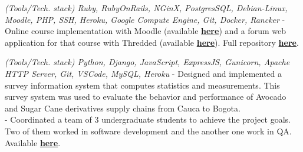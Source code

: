\documentclass[]{CV-JuanCamiloFlorez}
\begin{document}
\begin{minipage}[t]{0.66\textwidth}
    \focusareas{}
    \textit{(Tools/Tech. stack) Ruby, RubyOnRails, NGinX, PostgresSQL, Debian-Linux, Moodle, PHP, SSH, Heroku, Google Compute Engine, Git, Docker, Rancker}
        - Online course implementation with Moodle (available \textbf{\href{https://gitlab.com/VanJFlorez/animal_modeling_ethics/tree/master/docs/4 LMS build}{here}}) and a forum web application for that course with Thredded (available \textbf{\href{https://gitlab.com/VanJFlorez/animal_modeling_ethics/blob/master/docs/3\%20Social\%20WebApp/CP\%20etica\%20animal\%20webApp.pdf}{here}}). Full repository \textbf{\href{https://gitlab.com/VanJFlorez/animal_modeling_ethics/}{here}}. \\
        \sectionsep

    \focusareas{}
    \textit{(Tools/Tech. stack) Python, Django, JavaScript, ExpressJS, Gunicorn, Apache HTTP Server, Git, VSCode, MySQL, Heroku}
        - Designed and implemented a survey information system that computes statistics and measurements. This survey system was used to evaluate the behavior and performance of Avocado and Sugar Cane derivatives supply chains from Cauca to Bogota. \\
        - Coordinated a team of 3 undergraduate students to achieve the project goals. Two of them worked in software development and the another one work in QA. Available \textbf{\href{https://gitlab.com/VanJFlorez/sepro-webapp}{here}}. \\
        \sectionsep

 
\vspace{\topsep} %





\end{minipage}
\end{document}
